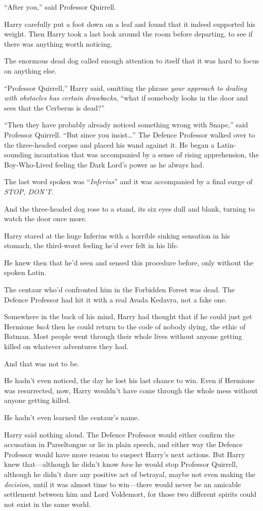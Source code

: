“After you,” said Professor Quirrell.

Harry carefully put a foot down on a leaf and found that it indeed supported his weight. Then Harry took a last look around the room before departing, to see if there was anything worth noticing.

The enormous dead dog called enough attention to itself that it was hard to focus on anything else.

“Professor Quirrell,” Harry said, omitting the phrase \emph{your approach to dealing with obstacles has certain drawbacks}, “what if somebody looks in the door and sees that the Cerberus is dead?”

“Then they have probably already noticed something wrong with Snape,” said Professor Quirrell.
“But since you insist…” The Defence Professor walked over to the three-headed corpse and placed his wand against it. He began a Latin-sounding incantation that was accompanied by a sense of rising apprehension, the Boy-Who-Lived feeling the Dark Lord’s power as he always had.

The last word spoken was “\emph{Inferius}” and it was accompanied by a final surge of \emph{STOP, DON’T}.

And the three-headed dog rose to a stand, its six eyes dull and blank, turning to watch the door once more.

Harry stared at the huge Inferius with a horrible sinking sensation in his stomach, the third-worst feeling he’d ever felt in his life.

He knew then that he’d seen and sensed this procedure before, only without the spoken Latin.

The centaur who’d confronted him in the Forbidden Forest was dead. The Defence Professor had hit it with a real Avada Kedavra, not a fake one.

Somewhere in the back of his mind, Harry had thought that if he could just get Hermione \emph{back} then he could return to the code of nobody dying, the ethic of Batman. Most people went through their whole lives without anyone getting killed on whatever adventures they had.

And that was not to be.

He hadn’t even noticed, the day he lost his last chance to win. Even if Hermione was resurrected, now, Harry wouldn’t have come through the whole mess without anyone getting killed.

He hadn’t even learned the centaur’s name.

Harry said nothing aloud. The Defence Professor would either confirm the accusation in Parseltongue or lie in plain speech, and either way the Defence Professor would have more reason to suspect Harry’s next actions. But Harry knew that—although he didn’t know \emph{how} he would stop Professor Quirrell, although he didn’t dare any positive act of betrayal, maybe not even making the \emph{decision}, until it was almost time to win—there would never be an amicable settlement between him and Lord Voldemort, for those two different spirits could not exist in the same world.


